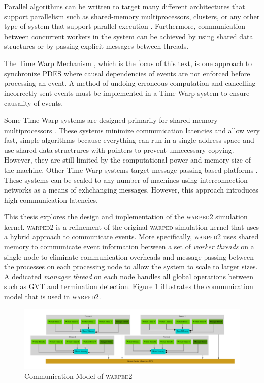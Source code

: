 \documentclass[11pt]{book}
\begin{document}
Parallel algorithms can be written to target many different architectures that support
parallelism such as shared-memory multiprocessors, clusters, or any other type of system
that support parallel execution \cite{culler-XX}.  Furthermore, communication between
concurrent workers in the system can be achieved by using shared data structures or by
passing explicit messages between threads.

The Time Warp Mechanism \cite{jefferson-85}, which is the focus of this text, is one approach
to synchronize PDES where causal dependencies of events are not enforced before processing
an event.  A method of undoing erroneous computation and cancelling incorrectly sent
events must be implemented in a Time Warp system to ensure causality of events. 

Some Time Warp systems are designed primarily for shared memory multiprocessors
\cite{das-94}.  These systems minimize communication latencies and allow very fast, simple
algorithms because everything can run in a single address space and use shared data
structrures with pointers to prevent unnecessary copying.  However, they are still limited
by the computational power and memory size of the machine.  Other Time Warp systems target
message passing based platforms \cite{carothers-00,ramanan-98-iscope}.  These systems can
be scaled to any number of machines using interconnection networks as a means of
exhchanging messages.  However, this approach introduces high communication latencies.

This thesis explores the design and implementation of the \textsc{warped2} simulation
kernel.  \textsc{warped2} is a refinement of the original \textsc{warped} simulation
kernel \cite{martin-96,ramanan-98-iscope} that uses a hybrid approach to communicate
events.  More specifically, \textsc{warped2} uses shared memory to communicate event
information between a set of \emph{worker threads} on a single node to eliminate
communication overheads and message passing between the processes on each processing node
to allow the system to scale to larger sizes.  A dedicated \emph{manager thread} on each
node handles all global operations between such as GVT and termination detection.  Figure
\ref{warped2_communication} illustrates the communication model that is used in
\textsc{warped2}.

\begin{figure}[H]
    \centering
    \includegraphics[width=\textwidth,quiet]{figs/graphviz/warped_communication.pdf}
    \caption{Communication Model of \textsc{warped2}}\label{warped2_communication}
\end{figure}
\end{document}
